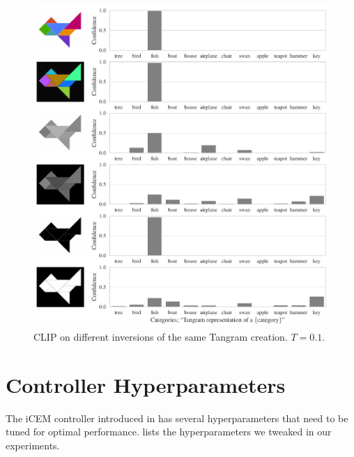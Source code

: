 \newpage
\begin{figure}[H]
    \centering
    \includegraphics[width=\textwidth]{images/tangram_fish_10.pdf}
    \caption{CLIP on different inversions of the same Tangram creation. \(T = 0.1\).}
    \label{fig:clip-tangram-inversions}
\end{figure}


\chapter{Controller Hyperparameters}
\label{sec:icem-details}
The iCEM controller introduced in  has several hyperparameters that need to be tuned for optimal performance.
 lists the hyperparameters we tweaked in our experiments.

